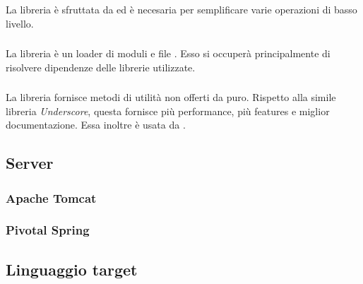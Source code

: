\subsubsection{\jquery}
La libreria \jquery{} è sfruttata da \jointjs{} ed è necesaria per semplificare varie operazioni di basso livello. 


\subsubsection{\requirejs}
La libreria \requirejs{} è un loader di moduli e file \js{}. Esso si occuperà principalmente di risolvere dipendenze delle librerie \js{} utilizzate.

\subsubsection{\lodash}
La libreria \lodash{} fornisce metodi di utilità non offerti da \js{} puro. Rispetto alla simile libreria \emph{Underscore}, questa fornisce più performance, più features e miglior documentazione. Essa inoltre è usata da \jointjs{}.

\subsection{Server}

\subsubsection{Apache Tomcat}

\subsubsection{Pivotal Spring}




\subsection{Linguaggio target}

